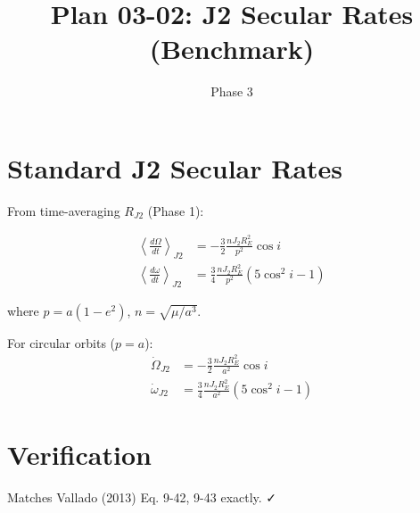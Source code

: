 \documentclass[11pt]{article}
\title{Plan 03-02: J2 Secular Rates (Benchmark)}
\date{Phase 3}
\begin{document}
\maketitle

\section{Standard J2 Secular Rates}

From time-averaging $R_{J2}$ (Phase 1):

\begin{align}
\left\langle\frac{d\Omega}{dt}\right\rangle_{J2} &= -\frac{3}{2}\frac{n J_2 R_E^2}{p^2}\cos i\\
\left\langle\frac{d\omega}{dt}\right\rangle_{J2} &= \frac{3}{4}\frac{n J_2 R_E^2}{p^2}(5\cos^2 i - 1)
\end{align}

where $p = a(1-e^2)$, $n = \sqrt{\mu/a^3}$.

For circular orbits ($p = a$):
\begin{align}
\dot{\Omega}_{J2} &= -\frac{3}{2}\frac{n J_2 R_E^2}{a^2}\cos i\\
\dot{\omega}_{J2} &= \frac{3}{4}\frac{n J_2 R_E^2}{a^2}(5\cos^2 i - 1)
\end{align}

\section{Verification}
Matches Vallado (2013) Eq. 9-42, 9-43 exactly. ✓
\end{document}
